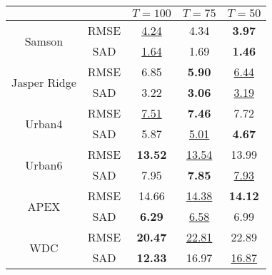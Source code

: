 \begin{tabular}{c | c | c c c}
  \toprule
  & & $T=100$  & $T=75$ & $T=50$ \\
  \hline
  \multirow{2}{*}{Samson}
  & RMSE & \underline{4.24} & 4.34 & \textbf{3.97} \\
  & SAD &  \underline{1.64} & 1.69 & \textbf{1.46} \\
  \hline
  \multirow{2}{*}{Jasper Ridge}
  & RMSE &  6.85 & \textbf{5.90} & \underline{6.44} \\
  & SAD &  3.22 & \textbf{3.06} & \underline{3.19} \\
  \hline
  \multirow{2}{*}{Urban4}
  & RMSE & \underline{7.51} & \textbf{7.46} & 7.72 \\
  & SAD & 5.87 & \underline{5.01} & \textbf{4.67} \\
  \hline
  \multirow{2}{*}{Urban6}
  & RMSE & \textbf{13.52} & \underline{13.54} & 13.99 \\
  & SAD &  7.95 & \textbf{7.85} & \underline{7.93} \\
  \hline
  \multirow{2}{*}{APEX}
  & RMSE & 14.66 & \underline{14.38} & \textbf{14.12} \\
  & SAD & \textbf{6.29} & \underline{6.58} & 6.99 \\
  \hline
  \multirow{2}{*}{WDC}
  & RMSE & \textbf{20.47} & \underline{22.81} & 22.89 \\
  & SAD & \textbf{12.33} & 16.97 & \underline{16.87} \\

  \bottomrule
\end{tabular}